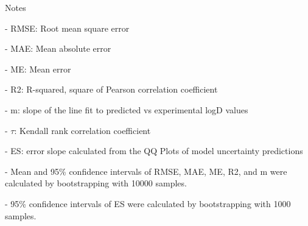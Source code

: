\documentclass{article}
\begin{document}
Notes

- RMSE: Root mean square error

- MAE: Mean absolute error

- ME: Mean error

- R2: R-squared, square of Pearson correlation coefficient

- m: slope of the line fit to predicted vs experimental logD values

- $\tau$:  Kendall rank correlation coefficient

- ES: error slope calculated from the QQ Plots of model uncertainty predictions

- Mean and 95\% confidence intervals of RMSE, MAE, ME, R2, and m were calculated by bootstrapping with 10000 samples.

- 95\% confidence intervals of ES were calculated by bootstrapping with 1000 samples.\end{document}
\end{document}

